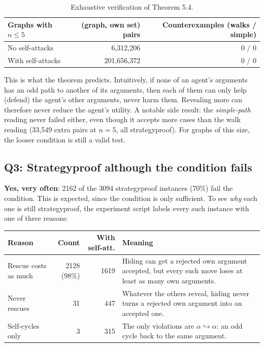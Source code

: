 \documentclass[11pt,a4paper]{article}
\newcommand{\ind}{\hookrightarrow}
\begin{document}
\begin{table}[h]
\centering
\small
\begin{tabular}{@{}lrr@{}}
\toprule
Graphs with $n \le 5$ & (graph, own set) pairs & Counterexamples (walks / simple) \\
\midrule
No self-attacks & 6,312,206 & 0 / 0 \\
With self-attacks & 201,656,372 & 0 / 0 \\
\bottomrule
\end{tabular}
\caption{Exhaustive verification of Theorem 5.4.}
\label{tab:exhaustive}
\end{table}

This is what the theorem predicts. Intuitively, if none of an agent's
arguments has an odd path to another of its arguments, then each of them can
only help (defend) the agent's other arguments, never harm them. Revealing
more can therefore never reduce the agent's utility. A notable side result:
the \emph{simple-path} reading never failed either, even though it accepts
more cases than the walk reading (33,549 extra pairs at $n = 5$, all
strategyproof). For graphs of this size, the looser condition is still a valid
test.

\subsection*{Q3: Strategyproof although the condition fails}

\textbf{Yes, very often}: 2162 of the 3094 strategyproof instances (70\%)
fail the condition. This is expected, since the condition is only sufficient.
To see \emph{why} each one is still strategyproof, the experiment script
labels every such instance with one of three reasons:

\begin{center}
\small
\begin{tabularx}{\linewidth}{@{}lrrX@{}}
\toprule
Reason & Count & With self-att. & Meaning \\
\midrule
Rescue costs as much & 2128 (98\%) & 1619 & Hiding can get a rejected own argument accepted, but every such move loses at least as many own arguments. \\
Never rescues & 31 & 447 & Whatever the others reveal, hiding never turns a rejected own argument into an accepted one. \\
Self-cycles only & 3 & 315 & The only violations are $\alpha \ind \alpha$: an odd cycle back to the same argument. \\
\bottomrule
\end{tabularx}
\end{center}
\end{document}
